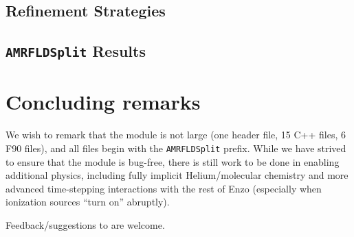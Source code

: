 \documentclass[letterpaper,10pt]{article}
\renewcommand{\(}{\left(}
\renewcommand{\)}{\right)}
\begin{document}
\subsection{Refinement Strategies}
\label{sec:AMRFLDSplit_refinement}




\subsection{{\tt AMRFLDSplit} Results}
\label{sec:AMRFLDSplit_results}




\section{Concluding remarks}
\label{sec:conclusions}

We wish to remark that the module is not large (one header
file, 15 C++ files, 6 F90 files), and all files begin with the 
{\tt AMRFLDSplit} prefix.  While we have strived to ensure that the
module is bug-free, there is still work to be done in enabling
additional physics, including fully implicit Helium/molecular
chemistry and more advanced time-stepping interactions with the rest
of Enzo (especially when ionization sources ``turn on'' abruptly).  

Feedback/suggestions to are welcome.




\end{document}
